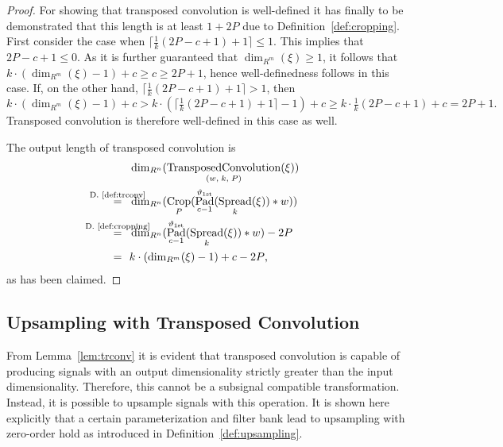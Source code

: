\documentclass[journal]{IEEEtran}
\newcommand{\conv}{\ast}
\newcommand{\nceil}[1]{\lceil #1 \rceil}
\newcommand{\equsing}[1]{\overset{\mathclap{\text{#1}}}{=}}
\DeclareMathOperator{\Padding}{Pad}
\DeclareMathOperator{\Cropping}{Crop}
\DeclareMathOperator{\Spreading}{Spread}
\DeclareMathOperator{\TransposedConvolution}{TransposedConvolution}
\newcommand{\Dirichlet}{1\text{st}}
\begin{document}
\begin{proof}
For showing that transposed convolution is well-defined it has finally to be demonstrated that this length is at least $1 + 2P$ due to Definition~\ref{def:cropping}.
First consider the case when $\nceil{\frac{1}{k}(2P - c + 1) + 1} \leq 1$.
This implies that $2P - c + 1 \leq 0$.
As it is further guaranteed that $\dim_{R^m}(\xi) \geq 1$, it follows that $k\cdot(\dim_{R^m}(\xi) - 1) + c \geq c \geq 2P + 1$, hence well-definedness follows in this case.
If, on the other hand, $\nceil{\frac{1}{k}(2P - c + 1) + 1} > 1$, then
\begin{displaymath}
  k\cdot(\dim_{R^m}(\xi) - 1) + c
  > k\cdot(\nceil{\tfrac{1}{k}(2P - c + 1) + 1} - 1) + c
  \geq k\cdot\tfrac{1}{k}(2P - c + 1) + c
  = 2P + 1\text{.}
\end{displaymath}
Transposed convolution is therefore well-defined in this case as well.

The output length of transposed convolution is
\begin{align*}
  & \dim_{R^n}(\TransposedConvolution_{(w,\; k,\; P)}(\xi))\\
  \equsing{D.~\ref{def:trconv}}\ \ & \dim_{R^n}( \Cropping_P( \Padding_{c - 1}^{\vartheta_{\Dirichlet}}( \Spreading_k(\xi)) \conv w) )\\
  \equsing{D.~\ref{def:cropping}}\ \ & \dim_{R^n}( \Padding_{c - 1}^{\vartheta_{\Dirichlet}}( \Spreading_k(\xi)) \conv w) - 2P\\
  =\ \ & k\cdot(\dim_{R^m}(\xi) - 1) + c - 2P\text{,}
\end{align*}
as has been claimed.
\end{proof}\subsection{Upsampling with Transposed Convolution}
From Lemma~\ref{lem:trconv} it is evident that transposed convolution is capable of producing signals with an output dimensionality strictly greater than the input dimensionality.
Therefore, this cannot be a subsignal compatible transformation.
Instead, it is possible to upsample signals with this operation.
It is shown here explicitly that a certain parameterization and filter bank lead to upsampling with zero-order hold as introduced in Definition~\ref{def:upsampling}.
\end{document}
